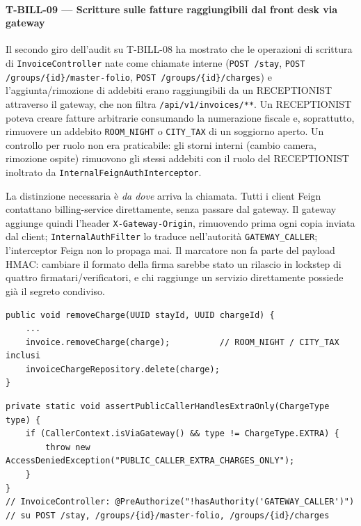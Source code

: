 ﻿\documentclass[a4paper,12pt]{report}
\begin{document}
\paragraph{T-BILL-09 --- Scritture sulle fatture raggiungibili dal front desk via gateway}
Il secondo giro dell'audit su T-BILL-08 ha mostrato che le operazioni di
scrittura di \texttt{InvoiceController} nate come chiamate interne
(\texttt{POST /stay}, \texttt{POST /groups/\{id\}/master-folio},
\texttt{POST /groups/\{id\}/charges}) e l'aggiunta/rimozione di addebiti
erano raggiungibili da un RECEPTIONIST attraverso il gateway, che non
filtra \texttt{/api/v1/invoices/**}. Un RECEPTIONIST poteva creare fatture
arbitrarie consumando la numerazione fiscale e, soprattutto, rimuovere un
addebito \texttt{ROOM\_NIGHT} o \texttt{CITY\_TAX} di un soggiorno aperto.
Un controllo per ruolo non era praticabile: gli storni interni (cambio
camera, rimozione ospite) rimuovono gli stessi addebiti con il ruolo del
RECEPTIONIST inoltrato da \texttt{InternalFeignAuthInterceptor}.

La distinzione necessaria è \emph{da dove} arriva la chiamata. Tutti i
client Feign contattano billing-service direttamente, senza passare dal
gateway. Il gateway aggiunge quindi l'header \texttt{X-Gateway-Origin},
rimuovendo prima ogni copia inviata dal client; \texttt{InternalAuthFilter}
lo traduce nell'autorità \texttt{GATEWAY\_CALLER}; l'interceptor Feign non
lo propaga mai. Il marcatore non fa parte del payload HMAC: cambiare il
formato della firma sarebbe stato un rilascio in lockstep di quattro
firmatari/verificatori, e chi raggiunge un servizio direttamente possiede
già il segreto condiviso.

\begin{insecurebox}[title={InvoiceServiceImpl.java --- qualunque tipo di addebito, da chiunque (baseline)}]
\begin{lstlisting}[style=java]
public void removeCharge(UUID stayId, UUID chargeId) {
    ...
    invoice.removeCharge(charge);          // ROOM_NIGHT / CITY_TAX inclusi
    invoiceChargeRepository.delete(charge);
}
\end{lstlisting}
\end{insecurebox}

\begin{securebox}[title={InvoiceServiceImpl.java --- un chiamante pubblico gestisce solo EXTRA (main)}]
\begin{lstlisting}[style=java]
private static void assertPublicCallerHandlesExtraOnly(ChargeType type) {
    if (CallerContext.isViaGateway() && type != ChargeType.EXTRA) {
        throw new AccessDeniedException("PUBLIC_CALLER_EXTRA_CHARGES_ONLY");
    }
}
// InvoiceController: @PreAuthorize("!hasAuthority('GATEWAY_CALLER')")
// su POST /stay, /groups/{id}/master-folio, /groups/{id}/charges
\end{lstlisting}
\end{securebox}
\end{document}
